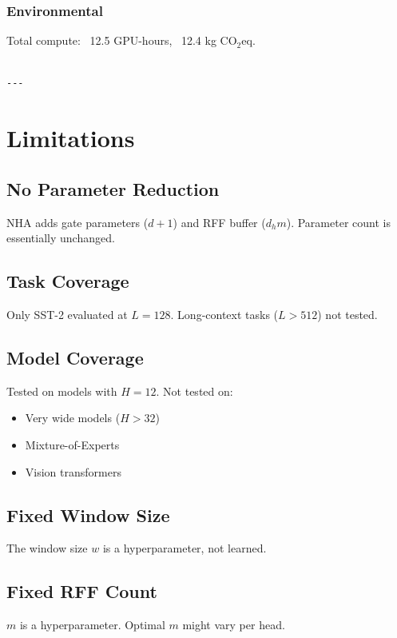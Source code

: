 \subsubsection{Environmental}
Total compute: ~12.5 GPU-hours, ~12.4 kg CO$_2$eq.
\begin{lstlisting}

---
\end{lstlisting}


\section{Limitations}

\subsection{No Parameter Reduction}

NHA adds gate parameters ($d + 1$) and RFF buffer ($d_h m$). Parameter 
count is essentially unchanged.

\subsection{Task Coverage}

Only SST-2 evaluated at $L = 128$. Long-context tasks ($L > 512$) not tested.

\subsection{Model Coverage}

Tested on models with $H = 12$. Not tested on:
\begin{itemize}
\item Very wide models ($H > 32$)
\item Mixture-of-Experts
\item Vision transformers

\end{itemize}
\subsection{Fixed Window Size}

The window size $w$ is a hyperparameter, not learned.

\subsection{Fixed RFF Count}

$m$ is a hyperparameter. Optimal $m$ might vary per head.

